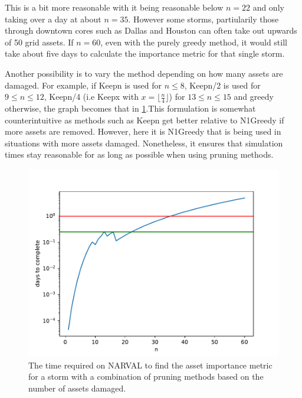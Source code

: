 \documentclass[12pt]{article}
\begin{document}
This is a bit more reasonable with it being reasonable below $n=22$ and only taking over a day at about $n=35$. However some storms, partiularily those through downtown cores such as Dallas and Houston can often take out upwards of 50 grid assets. If $n=60$, even with the purely greedy method, it would still take about five days to calculate the importance metric for that single storm. \par
Another possibility is to vary the method depending on how many assets are damaged. For example, if Keepn is used for $n\leq8$, Keepn/2 is used for $9 \leq n \leq 12$, Keepn/4 (i.e Keepx  with $x = \lfloor \frac{n}{4} \rfloor$) for $13 \leq n \leq 15$ and greedy otherwise, the graph becomes that in \ref{fig:Keepvariednumsims}.This formulation is somewhat counterintuitive as methods such as Keepn get better relative to N1Greedy if more assets are removed. However, here it is N1Greedy that is being used in situations with more assets damaged. Nonetheless, it ensures that simulation times stay reasonable for as long as possible when using pruning methods.\par


\begin{figure}[ht]
    \centering %
    \includegraphics[width=\textwidth]{Keepvariednumsims.pdf}
    \caption[Time required to find importance metric with various methods]{The time required on NARVAL to find the asset importance metric for a storm with a combination of pruning methods based on the number of assets damaged.}
    \label{fig:Keepvariednumsims}
\end{figure}
\end{document}
